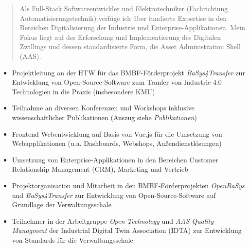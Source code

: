 \documentclass[10pt,a4paper,ragged2e,withhyper]{altacv}
\begin{document}
\begin{paracol}{2}
        \vspace{-6pt}
            \begin{quote}
                Als Full-Stack Softwareentwickler und Elektrotechniker (Fachrichtung Automatisierungstechnik) verfüge ich über fundierte Expertise in den Bereichen Digitalisierung der Industrie und Enterprise-Applikationen.
                Mein Fokus liegt auf der Erforschung und Implementierung des Digitalen Zwillings und dessen standardisierte Form, die Asset Administration Shell (AAS).
            \end{quote}
        
            \begin{itemize}
                \item Projektleitung an der HTW für das BMBF-Förderprojekt \textit{BaSys4Transfer} zur Entwicklung von Open-Source-Software zum Tranfer von Industrie 4.0 Technologien in die Praxis (insbesondere KMU)
                \item Teilnahme an diversen Konferenzen und Workshops inklusive wissenschaftlicher Publikationen (Auszug siehe \textit{Publikationen})
            \end{itemize}
            \divider

            \begin{itemize}
                \item Frontend Webentwicklung auf Basis von Vue.js für die Umsetzung von Webapplikationen (u.a. Dashboards, Webshops, Außendienstlösungen)
                \item Umsetzung von Enterprise-Applikationen in den Bereichen Customer Relationship Management (CRM), Marketing und Vertrieb
            \end{itemize}
            \divider

            \begin{itemize}
                \item Projektorganisation und Mitarbeit in den BMBF-Förderprojekten \textit{OpenBaSys}\\ und \textit{BaSys4Transfer} zur Entwicklung von Open-Source-Software auf Grundlage der Verwaltungsschale
                \item Teilnehmer in der Arbeitgruppe \textit{Open Technology} und \textit{AAS Quality Managment} der Industrial Digital Twin Association (IDTA) zur Entwicklung von Standards für die Verwaltungsschale
            \end{itemize}
            \divider


\end{paracol}
\end{document}
